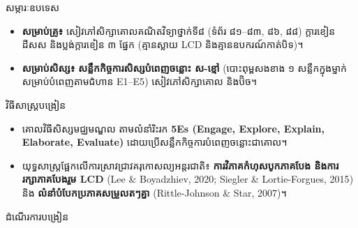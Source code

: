 \documentclass[a4paper,10pt]{article}
\newcommand{\en}[1]{{\TimesEn #1}}
\newcommand{\enbf}[1]{{\TimesEn\bfseries #1}}
\newcommand{\wcirc}{{\CourierCirc\fontsize{9.5pt}{11pt}\selectfont o}}
\begin{document}
\vspace{4pt}

{\muol \enbf{II.} សម្ភារៈឧបទេស}\par
\vspace{2pt}
\begin{itemize}[leftmargin=1.35cm, label=\wcirc, itemsep=1pt, topsep=2pt, parsep=0pt]
  \item \textbf{សម្រាប់គ្រូ៖} សៀវភៅសិក្សាគោលគណិតវិទ្យាថ្នាក់ទី៨ (ទំព័រ ៨១–៨៣, ៨៦, ៨៨) ក្ដារខៀន ដីសស និងប្លង់ក្ដារខៀន ៣ ផ្នែក (គ្មានស្លាយ \en{LCD} និងគ្មានឧបករណ៍កាត់បិទ)។
  \item \textbf{សម្រាប់សិស្ស៖} \textbf{សន្លឹកកិច្ចការសិស្សបំពេញចន្លោះ ស-ខ្មៅ} (បោះពុម្ពសងខាង ១ សន្លឹកក្នុងម្នាក់ សម្រាប់បំពេញតាមជំហាន \en{E1--E5}) សៀវភៅសិក្សាគោល និងប៊ិច។
\end{itemize}

\vspace{4pt}

{\muol \enbf{III.} វិធីសាស្រ្តបង្រៀន}\par
\vspace{2pt}
\begin{itemize}[leftmargin=1.35cm, label=\wcirc, itemsep=1pt, topsep=2pt, parsep=0pt]
  \item គោលវិធីសិស្សមជ្ឈមណ្ឌល តាមលំនាំរិះរក \textbf{\en{5Es} (\en{Engage, Explore, Explain, Elaborate, Evaluate})} ដោយប្រើសន្លឹកកិច្ចការបំពេញចន្លោះជាគោល។
  \item យុទ្ធសាស្ត្រផ្អែកលើការស្រាវជ្រាវគរុកោសល្យអន្តរជាតិ៖ \textbf{ការវិភាគកំហុសបូកភាគបែង និងការរក្សាភាគបែងរួម \en{LCD}} (\en{Lee \& Boyadzhiev, 2020; Siegler \& Lortie-Forgues, 2015}) និង \textbf{លំនាំបំបែកប្រភាគសម្រួលតៗគ្នា} (\en{Rittle-Johnson \& Star, 2007})។
\end{itemize}

\vspace{4pt}

{\muol \enbf{IV.} ដំណើរការបង្រៀន}\par
\vspace{2pt}
\end{document}
